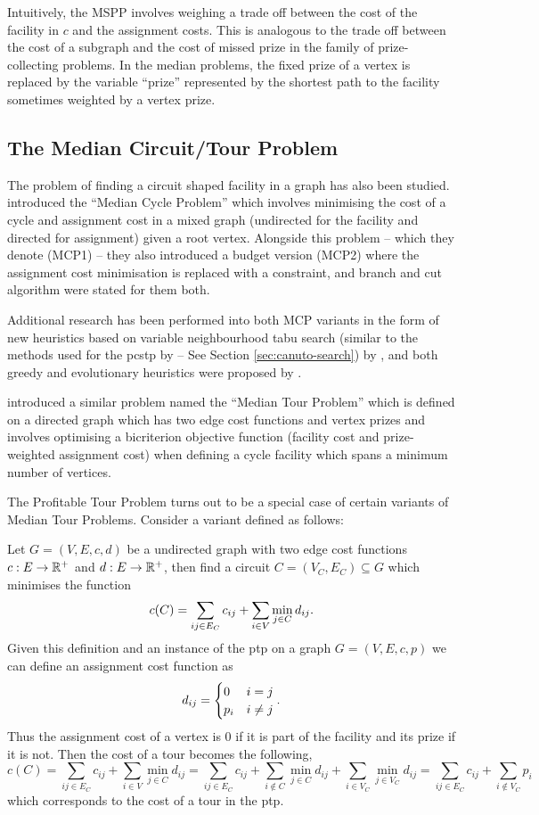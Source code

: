  Intuitively, the MSPP involves weighing a trade off between the cost of the facility
 in $c$ and the assignment costs. 
 This is analogous to the trade off between the cost of a subgraph and the cost of missed prize in the
 family of prize-collecting problems. In the median problems, the fixed prize of a vertex is
 replaced by the variable ``prize'' represented by the shortest path to the facility sometimes weighted
 by a vertex prize.
 \subsection{The Median Circuit/Tour Problem}
 The problem of finding a circuit shaped facility in a graph has also been studied.
 \citet{labbe1999themedian} introduced the ``Median Cycle Problem'' which involves
 minimising the cost of a cycle and assignment cost in a mixed graph (undirected for
 the facility and directed for assignment) given a root vertex. Alongside this problem
 -- which they denote (MCP1) -- they also introduced a budget version (MCP2) where the
 assignment cost minimisation is replaced with a constraint, and branch and cut algorithm
 were stated for them both.

 Additional research has been performed into both MCP variants
 in the form of new heuristics based on variable neighbourhood tabu search
 (similar to the methods used for the \gls{pcstp} by \citet{canuto2001local} --
 See Section \ref{sec:canuto-search}) by \citet{perez2003variable}, and both
 greedy and evolutionary heuristics were proposed by \citet{renaud2004efficient}.
 
 \citet{current1994median} introduced a similar problem named the ``Median Tour Problem''
 which is defined on a directed graph which has two edge cost functions and vertex prizes
 and involves optimising a bicriterion objective function
 (facility cost and prize-weighted assignment cost)
 when defining a cycle facility which spans a minimum number of vertices.

 The Profitable Tour Problem turns out to be a special case of certain variants of Median
 Tour Problems. Consider a variant defined as follows:
 
 Let $G = (V, E, c, d)$ be a undirected graph with two edge cost functions
 $c : E \to \mathbb{R}^+$ and $d : E \to \mathbb{R}^+$, then find a circuit $C = (V_C, E_C) \subseteq G$
 which minimises
 the function
 \[c(C) = \sum_{ij \in E_C} c_{ij} + \sum_{i \in V} \min_{j \in C} d_{ij} \mathnormal{.}\]
 Given this definition and an instance of the \gls{ptp} on a graph $G = (V, E, c, p)$
 we can define an assignment cost function as
 $$d_{ij} =
 \begin{cases}
   0 & i = j \\
   p_i & i \neq j
 \end{cases}\mathnormal{.}
 $$
 Thus the assignment cost of a vertex is 0 if it is part of the facility and its prize
 if it is not. Then the cost of a tour becomes the following,
 $$c(C) = \sum_{ij \in E_C} c_{ij} + \sum_{i \in V} \min_{j \in C} d_{ij} =
 \sum_{ij \in E_C} c_{ij} + \sum_{i \not\in C} \min_{j \in C} d_{ij} + \sum_{i \in V_C} \min_{j \in V_C} d_{ij}
 = \sum_{ij \in E_C} c_{ij} + \sum_{i \not\in V_C}  p_i$$
 which corresponds to the cost of a tour in the \gls{ptp}.
